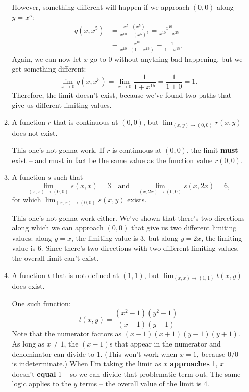 \begin{enumerate}[leftmargin=0pt]
\begin{enumerate}
\begin{red}
            However, something different will happen if we approach $(0, 0)$ along $y=x^5$:
            \begin{align*}
                q(x, x^5) &= \frac{x^{5}\cdot (x^5)}{x^{10}+(x^5)^{5}}
                = \frac{x^{10}}{x^{10} + x^{25}} \\
                &= \frac{x^{10}}{x^{10}\cdot(1 + x^{15})} 
                = \frac{1}{1 + x^{15}}.
            \end{align*}
            Again, we can now let $x$ go to 0 without anything bad happening, but we get something different:
            \[\lim_{x\to 0} q(x, x^5) = \lim_{x\to 0}\frac{1}{1 + x^{15}} = \frac{1}{1+0} = 1.\]
            Therefore, the limit doesn't exist, because we've found two paths that give us different limiting values.
        \end{red}
        
        \item A function $r$ that is continuous at $(0, 0)$, but $\lim_{(x, y) \to (0, 0)} r(x, y)$ does not exist.
        
        \begin{red}
            This one's not gonna work. If $r$ is continuous at $(0, 0)$, the limit \textbf{must} exist -- and must in fact be the same value as the function value $r(0,0)$.
        \end{red}
        
        \item A function $s$ such that 
        \[\lim_{(x, x) \to (0, 0)} s(x, x) = 3 \quad \textrm{and} \quad
        \lim_{(x, 2x) \to (0, 0)} s(x, 2x) = 6,\]
        for which $\lim_{(x, x) \to (0, 0)} s(x, y)$ exists.
        
        \begin{red}
            This one's not gonna work either. We've shown that there's two directions along which we can approach $(0, 0)$ that give us two different limiting values: along $y=x$, the limiting value is 3, but along $y=2x$, the limiting value is 6. Since there's two directions with two different limiting values, the overall limit can't exist.
        \end{red}
        
        \item A function $t$ that is not defined at $(1, 1)$, but $\lim_{(x, x) \to (1, 1)} t(x, y)$ does exist.
        
        \begin{red}
            One such function:
            \[t(x, y) = \frac{(x^2-1)(y^2-1)}{(x-1)(y-1)}\]
            Note that the numerator factors as $(x-1)(x+1)(y-1)(y+1)$. As long as $x\neq 1$, the $(x-1)$s that appear in the numerator and denominator can divide to 1. (This won't work when $x=1$, because $0/0$ is indeterminate.) When I'm taking the limit as $x$ \textbf{approaches} 1, $x$ doesn't \textbf{equal} 1 -- so we can divide that problematic term out. The same logic applies to the $y$ terms -- the overall value of the limit is 4.
            

\end{red}
\end{enumerate}
\end{enumerate}
